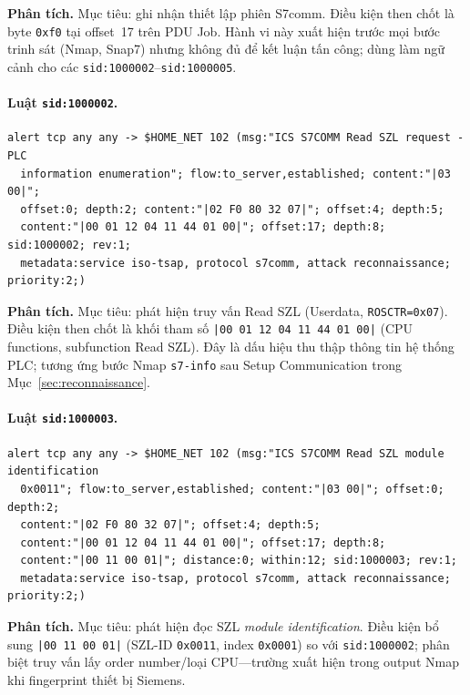 \documentclass[../main.tex]{subfiles}
\begin{document}
\noindent\textbf{Phân tích.}
Mục tiêu: ghi nhận thiết lập phiên S7comm. Điều kiện then chốt là byte \texttt{0xf0} tại offset~17 trên PDU Job. Hành vi này xuất hiện trước mọi bước trinh sát (Nmap, Snap7) nhưng không đủ để kết luận tấn công; dùng làm ngữ cảnh cho các \texttt{sid:1000002}--\texttt{sid:1000005}.

\paragraph{Luật \texttt{sid:1000002}.}
\begin{footnotesize}
\begin{verbatim}
alert tcp any any -> $HOME_NET 102 (msg:"ICS S7COMM Read SZL request - PLC
  information enumeration"; flow:to_server,established; content:"|03 00|";
  offset:0; depth:2; content:"|02 F0 80 32 07|"; offset:4; depth:5;
  content:"|00 01 12 04 11 44 01 00|"; offset:17; depth:8; sid:1000002; rev:1;
  metadata:service iso-tsap, protocol s7comm, attack reconnaissance; priority:2;)
\end{verbatim}
\end{footnotesize}

\noindent\textbf{Phân tích.}
Mục tiêu: phát hiện truy vấn Read SZL (Userdata, \texttt{ROSCTR=0x07}). Điều kiện then chốt là khối tham số \texttt{|00 01 12 04 11 44 01 00|} (CPU functions, subfunction Read SZL). Đây là dấu hiệu thu thập thông tin hệ thống PLC; tương ứng bước Nmap \texttt{s7-info} sau Setup Communication trong Mục~\ref{sec:reconnaissance}.

\paragraph{Luật \texttt{sid:1000003}.}
\begin{footnotesize}
\begin{verbatim}
alert tcp any any -> $HOME_NET 102 (msg:"ICS S7COMM Read SZL module identification
  0x0011"; flow:to_server,established; content:"|03 00|"; offset:0; depth:2;
  content:"|02 F0 80 32 07|"; offset:4; depth:5;
  content:"|00 01 12 04 11 44 01 00|"; offset:17; depth:8;
  content:"|00 11 00 01|"; distance:0; within:12; sid:1000003; rev:1;
  metadata:service iso-tsap, protocol s7comm, attack reconnaissance; priority:2;)
\end{verbatim}
\end{footnotesize}

\noindent\textbf{Phân tích.}
Mục tiêu: phát hiện đọc SZL \emph{module identification}. Điều kiện bổ sung \texttt{|00 11 00 01|} (SZL-ID \texttt{0x0011}, index \texttt{0x0001}) so với \texttt{sid:1000002}; phân biệt truy vấn lấy order number/loại CPU---trường xuất hiện trong output Nmap khi fingerprint thiết bị Siemens.
\end{document}
